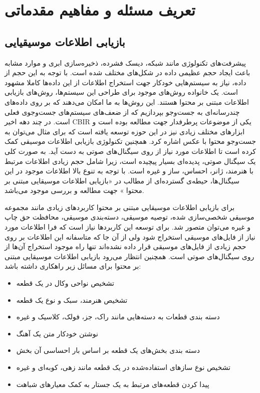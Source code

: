 \chapter{تعریف مسئله و مفاهیم مقدماتی}
\section{بازیابی اطلاعات موسیقیایی}

پیشرفت‌های تکنولوژی مانند شبکه، دیسک فشرده، ذخیره‌سازی ابری و موارد مشابه باعث
ایجاد حجم عظیمی داده در شکل‌های مختلف شده است. با توجه به این حجم از داده، نیاز
به سیستم‌هایی خودکار جهت استخراج اطلاعات از این داده‌ها کاملا مشهود است. یک
خانواده روش‌های موجود برای طراحی این سیستم‌ها، روش‌های بازیابی اطلاعات مبتنی بر
محتوا%
 هستند. این روش‌ها به ما امکان می‌دهند که بر روی داده‌های چندرسانه‌ای به
جست‌وجو بپردازیم که از ضعف‌های سیستم‌های جست‌وجوی فعلی است. در چند دهه اخیر
CBIR
یکی از موضوعات پرطرفدار جهت مطالعه بوده است و ابزارهای مختلف زیادی نیز در این
حوزه توسعه یافته است که برای مثال می‌توان به جست‌وجو محتوا با عکس%
اشاره کرد. همچنین تکنولوژی بازیابی اطلاعات موسیقی%
کمک کرده است تا اطلاعات مورد نیاز از روی سیگنال‌های صوتی به دست آید. به صورت
کلی یک سیگنال صوتی، پدیده‌ای بسیار پیچیده است، زیرا شامل حجم زیادی اطلاعات
مرتبط با هنرمند، ژانر، احساس، ساز و غیره است. با توجه به تنوع بالا اطلاعات
موجود در این سیگنال‌ها، حیطه‌ی گسترده‌ای از مطالب در «بازیابی اطلاعات موسیقایی
مبتنی بر محتوا%
%
» جهت مطالعه و بررسی موجود می‌باشد.


برای بازیابی اطلاعات موسیقایی مبتنی بر محتوا کاربردهای زیادی مانند مجموعه
موسیقی شخصی‌سازی شده، توصیه موسیقی، دسته‌بندی موسیقی، محافظت حق چاپ و غیره
می‌توان متصور شد. برای توسعه این کاربردها نیاز است که فرا اطلاعات مورد نیاز از
فایل‌های موسیقی استخراج شود ولی از آن جا که متاسفانه این اطلاعات بر روی حجم
زیادی از فایل‌های موسیقی قرار داده نشده‌اند تنها راه موجود استخراج آن‌ها از روی
سیگنال‌های صوتی است. همچنین انتظار می‌رود بازیابی اطلاعات موسیقایی مبتنی بر
محتوا برای مسائل زیر راهکاری داشته باشد:
\begin{itemize}
\item تشخیص نواحی وکال در یک قطعه
\item تشخیص هنرمند، سبک و نوع یک قطعه
\item دسته بندی قطعات به دسته‌هایی مانند راک، جز، فولک، کلاسیک و غیره
\item نوشتن خودکار متن یک آهنگ
\item دسته بندی بخش‌های یک قطعه بر اساس بار احساسی آن بخش
\item تشخیص نوع سازهای استفاده‌شده در یک قطعه مانند زهی، کوبه‌ای و غیره
\item پیدا کردن قطعه‌های مرتبط به یک جستار به کمک معیارهای شباهت	
\end{itemize}

